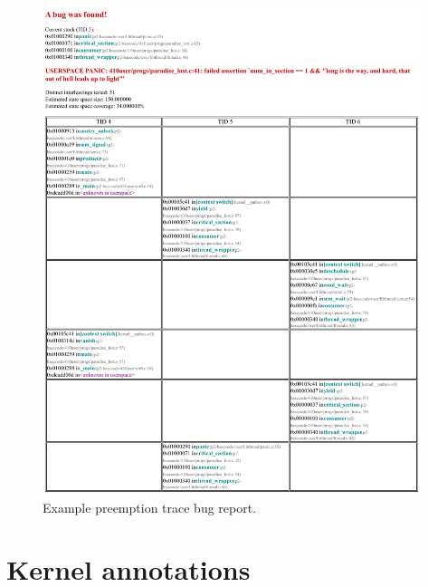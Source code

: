 \begin{figure}[h!]
	\begin{center}
		\includegraphics[width=0.985\textwidth]{bugreport.pdf}
	\end{center}
	\caption{Example preemption trace bug report.}
	\label{fig:bugreport}
\end{figure}


\section{Kernel annotations}


